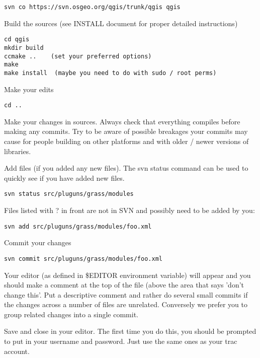 \begin{verbatim}
svn co https://svn.osgeo.org/qgis/trunk/qgis qgis
\end{verbatim}

Build the sources (see INSTALL document for proper detailed instructions)

\begin{verbatim}
cd qgis
mkdir build
ccmake ..    (set your preferred options)
make
make install  (maybe you need to do with sudo / root perms)
\end{verbatim}

Make your edits

\begin{verbatim}
cd ..
\end{verbatim}

Make your changes in sources. Always check that everything compiles before
making any commits.  Try to be aware of possible breakages your commits may
cause for people building on other platforms and with older / newer versions of
libraries.

Add files (if you added any new files). The svn status command can be used to
quickly see if you have added new files.

\begin{verbatim}
svn status src/pluguns/grass/modules
\end{verbatim}

Files listed with ? in front are not in SVN and possibly need to be added by
you:

\begin{verbatim}
svn add src/pluguns/grass/modules/foo.xml
\end{verbatim}

Commit your changes

\begin{verbatim}
svn commit src/pluguns/grass/modules/foo.xml
\end{verbatim}

Your editor (as defined in \$EDITOR environment variable) will appear and you
should make a comment at the top of the file (above the area that says 'don't
change this'. Put a descriptive comment and rather do several small commits if
the changes across a number of files are unrelated. Conversely we prefer you to
group related changes into a single commit.

Save and close in your editor. The first time you do this, you should be
prompted to put in your username and password. Just use the same ones as your
trac account.


